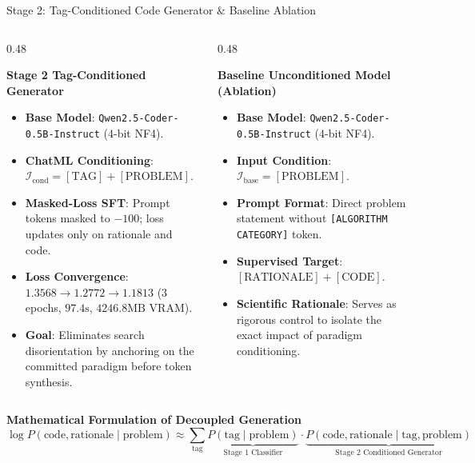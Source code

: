\documentclass[aspectratio=169,10pt]{beamer}
\begin{document}
\begin{frame}{Stage 2: Tag-Conditioned Code Generator \& Baseline Ablation}
  \begin{columns}[T]
    \begin{column}{0.48\textwidth}
      \begin{block}{\textbf{Stage 2 Tag-Conditioned Generator}}
        \begin{itemize}\itemsep=1.5pt\scriptsize
          \item \textbf{Base Model}: \texttt{Qwen2.5-Coder-0.5B-Instruct} (4-bit NF4).
          \item \textbf{ChatML Conditioning}: $\mathcal{I}_{\text{cond}} = [\text{TAG}] + [\text{PROBLEM}]$.
          \item \textbf{Masked-Loss SFT}: Prompt tokens masked to $-100$; loss updates only on rationale and code.
          \item \textbf{Loss Convergence}: $1.3568 \to 1.2772 \to 1.1813$ (3 epochs, $97.4\text{s}$, $4246.8\text{MB}$ VRAM).
          \item \textbf{Goal}: Eliminates search disorientation by anchoring on the committed paradigm before token synthesis.
        \end{itemize}
      \end{block}
    \end{column}

    \begin{column}{0.48\textwidth}
      \begin{exampleblock}{\textbf{Baseline Unconditioned Model (Ablation)}}
        \begin{itemize}\itemsep=1.5pt\scriptsize
          \item \textbf{Base Model}: \texttt{Qwen2.5-Coder-0.5B-Instruct} (4-bit NF4).
          \item \textbf{Input Condition}: $\mathcal{I}_{\text{base}} = [\text{PROBLEM}]$.
          \item \textbf{Prompt Format}: Direct problem statement without \texttt{[ALGORITHM CATEGORY]} token.
          \item \textbf{Supervised Target}: $[\text{RATIONALE}] + [\text{CODE}]$.
          \item \textbf{Scientific Rationale}: Serves as rigorous control to isolate the exact impact of paradigm conditioning.
        \end{itemize}
      \end{exampleblock}
    \end{column}
  \end{columns}

  \vspace{2pt}
  \begin{alertblock}{\textbf{Mathematical Formulation of Decoupled Generation}}
    \scriptsize
    $$\log P(\text{code}, \text{rationale} \mid \text{problem}) \approx \sum_{\text{tag}} \underbrace{P(\text{tag} \mid \text{problem})}_{\text{Stage 1 Classifier}} \cdot \underbrace{P(\text{code}, \text{rationale} \mid \text{tag}, \text{problem})}_{\text{Stage 2 Conditioned Generator}}$$
  \end{alertblock}
\end{frame}
\end{document}
